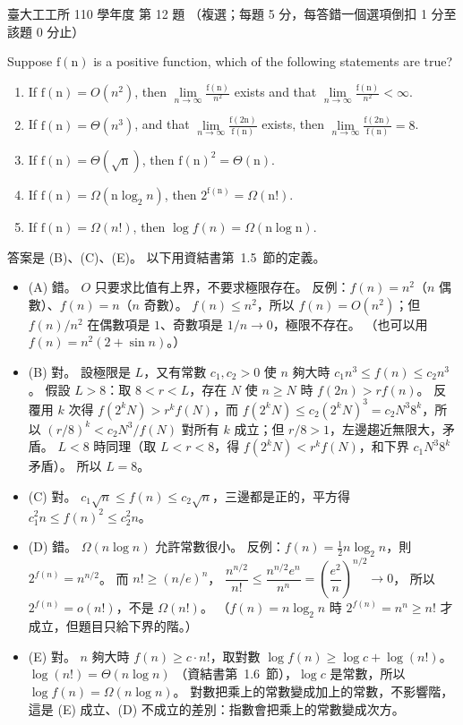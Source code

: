\begin{pastexam}[label={px:ntu-110-ie-ds-12}]{臺大工工所 110 學年度 第 12 題}
（複選；每題 5 分，每答錯一個選項倒扣 1 分至該題 0 分止）

Suppose $\mathrm{f(n)}$ is a positive function, which of the following statements are true?
\begin{enumerate}[label=(\Alph*)]
\item If $\mathrm{f(n)}=O(n^2)$, then $\lim\limits_{n\to\infty}\frac{\mathrm{f(n)}}{n^2}$ exists and that
$\lim\limits_{n\to\infty}\frac{\mathrm{f(n)}}{n^2}<\infty$.
\item If $\mathrm{f(n)}=\Theta(n^3)$, and that $\lim\limits_{n\to\infty}\frac{\mathrm{f(2n)}}{\mathrm{f(n)}}$
exists, then $\lim\limits_{n\to\infty}\frac{\mathrm{f(2n)}}{\mathrm{f(n)}}=8$.
\item If $\mathrm{f(n)}=\Theta(\sqrt{\mathrm{n}})$, then $\mathrm{f(n)}^2=\Theta(\mathrm{n})$.
\item If $\mathrm{f(n)}=\Omega(\mathrm{n}\log_2 n)$, then $2^{\mathrm{f(n)}}=\Omega(\mathrm{n!})$.
\item If $\mathrm{f(n)}=\Omega(n!)$, then $\log f(n)=\Omega(\mathrm{n}\log\mathrm{n})$.
\end{enumerate}
\end{pastexam}

\begin{pastsoln}
答案是 (B)、(C)、(E)。 以下用資結書第~1.5~節的定義。

\begin{itemize}
\item (A) 錯。 $O$ 只要求比值有上界，不要求極限存在。 反例：$f(n) = n^2$（$n$ 偶數）、$f(n) = n$（$n$ 奇數）。
$f(n) \le n^2$，所以 $f(n) = O(n^2)$；但 $f(n)/n^2$ 在偶數項是 $1$、奇數項是 $1/n \to 0$，極限不存在。
（也可以用 $f(n) = n^2(2 + \sin n)$。）
\item (B) 對。 設極限是 $L$，又有常數 $c_1, c_2 > 0$ 使 $n$ 夠大時 $c_1 n^3 \le f(n) \le c_2 n^3$。 假設
$L > 8$：取 $8 < r < L$，存在 $N$ 使 $n \ge N$ 時 $f(2n) > r f(n)$。 反覆用 $k$ 次得
$f(2^k N) > r^k f(N)$，而 $f(2^k N) \le c_2 (2^k N)^3 = c_2 N^3 8^k$，所以 $(r/8)^k < c_2 N^3 / f(N)$
對所有 $k$ 成立；但 $r/8 > 1$，左邊趨近無限大，矛盾。 $L < 8$ 時同理（取 $L < r < 8$，得
$f(2^k N) < r^k f(N)$，和下界 $c_1 N^3 8^k$ 矛盾）。 所以 $L = 8$。
\item (C) 對。 $c_1\sqrt n \le f(n) \le c_2\sqrt n$，三邊都是正的，平方得 $c_1^2 n \le f(n)^2 \le c_2^2 n$。
\item (D) 錯。 $\Omega(n\log n)$ 允許常數很小。 反例：$f(n) = \frac12 n\log_2 n$，則
$2^{f(n)} = n^{n/2}$。 而 $n! \ge (n/e)^n$，
$\dfrac{n^{n/2}}{n!} \le \dfrac{n^{n/2}e^n}{n^n} = \left(\dfrac{e^2}{n}\right)^{n/2} \to 0$，
所以 $2^{f(n)} = o(n!)$，不是 $\Omega(n!)$。 （$f(n) = n\log_2 n$ 時 $2^{f(n)} = n^n \ge n!$ 才成立，但題目只給下界的階。）
\item (E) 對。 $n$ 夠大時 $f(n) \ge c\cdot n!$，取對數 $\log f(n) \ge \log c + \log(n!)$。 $\log(n!) = \Theta(n\log n)$
（資結書第~1.6~節），$\log c$ 是常數，所以 $\log f(n) = \Omega(n\log n)$。 對數把乘上的常數變成加上的常數，不影響階，
這是 (E) 成立、(D) 不成立的差別：指數會把乘上的常數變成次方。
\end{itemize}
\end{pastsoln}
